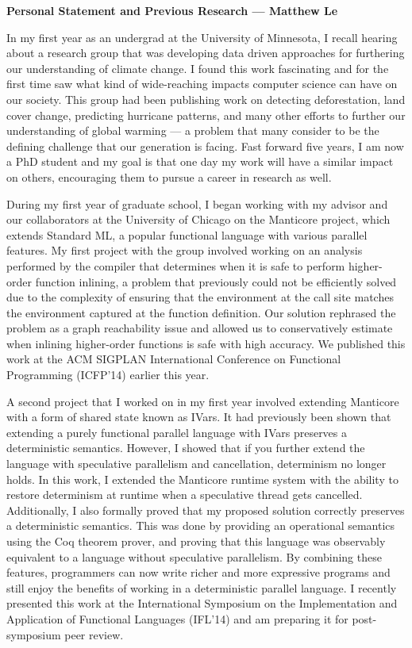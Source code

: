 \documentclass[12pt]{article}
\begin{document}
\centerline{\bf Personal Statement and Previous Research --- Matthew Le} 


In my first year as an undergrad at the University of Minnesota, I recall hearing about a research group that was developing data driven approaches for furthering our understanding of climate change. I found this work fascinating and for the first time saw what kind of wide-reaching impacts computer science can have on our society. This group had been publishing work on detecting deforestation, land cover change, predicting hurricane patterns, and many other efforts to further our understanding of global warming --- a problem that many consider to be the defining challenge that our generation is facing. Fast forward five years, I am now a PhD student and my goal is that one day my work will have a similar impact on others, encouraging them to pursue a career in research as well.

During my first year of graduate school, I began working with my advisor and our collaborators at the University of Chicago on the Manticore project, which extends Standard ML, a popular functional language with various parallel features.  My first project with the group involved working on an analysis performed by the compiler that determines when it is safe to perform higher-order function inlining, a problem that previously could not be efficiently solved due to the complexity of ensuring that the environment at the call site matches the environment captured at the function definition.  Our solution rephrased the problem as a graph reachability issue and allowed us to conservatively estimate when inlining higher-order functions is safe with high accuracy.  We published this work at the ACM SIGPLAN International Conference on Functional Programming (ICFP'14) earlier this year.  

A second project that I worked on in my first year involved extending Manticore with a form of shared state known as IVars.  It had previously been shown that extending a purely functional parallel language with IVars preserves a deterministic semantics.  However, I showed that if you further extend the language with speculative parallelism and cancellation, determinism no longer holds.  In this work, I extended the Manticore runtime system with the ability to restore determinism at runtime when a speculative thread gets cancelled.  Additionally, I also formally proved that my proposed solution correctly preserves a deterministic semantics.  This was done by providing an operational semantics using the Coq theorem prover, and proving that this language was observably equivalent to a language without speculative parallelism.  By combining these features, programmers can now write richer and more expressive programs and still enjoy the benefits of working in a deterministic parallel language.  I recently presented this work at the International Symposium on the Implementation and Application of Functional Languages (IFL'14) and am preparing it for post-symposium peer review.  
\end{document}
